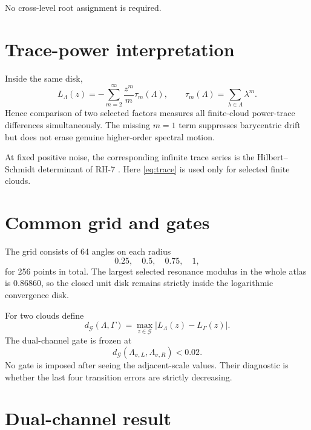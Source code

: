\documentclass[11pt]{article}
\theoremstyle{remark}\newtheorem{remark}[theorem]{Remark}
\begin{document}
No cross-level root assignment is required.

\section{Trace-power interpretation}

Inside the same disk,
\begin{equation}\label{eq:trace}
 L_\Lambda(z)=
 -\sum_{m=2}^{\infty}\frac{z^m}{m}\tau_m(\Lambda),
 \qquad
 \tau_m(\Lambda)=\sum_{\lambda\in\Lambda}\lambda^m.
\end{equation}
Hence comparison of two selected factors measures all finite-cloud power-trace
differences simultaneously. The missing $m=1$ term suppresses barycentric
drift but does not erase genuine higher-order spectral motion.

At fixed positive noise, the corresponding infinite trace series is the
Hilbert--Schmidt determinant of RH-7 \citep{WangRH7}. Here
\eqref{eq:trace} is used only for selected finite clouds.

\section{Common grid and gates}

The grid consists of 64 angles on each radius
\[
 0.25,\quad0.5,\quad0.75,\quad1,
\]
for 256 points in total. The largest selected resonance modulus in the whole
atlas is $0.86860$, so the closed unit disk remains strictly inside the
logarithmic convergence disk.

For two clouds define
\begin{equation}\label{eq:metric}
 d_{\mathcal G}(\Lambda,\Gamma)
 =\max_{z\in\mathcal G}|L_\Lambda(z)-L_\Gamma(z)|.
\end{equation}
The dual-channel gate is frozen at
\[
 d_{\mathcal G}(\Lambda_{\sigma,L},
 \Lambda_{\sigma,R})<0.02.
\]
No gate is imposed after seeing the adjacent-scale values. Their diagnostic is
whether the last four transition errors are strictly decreasing.

\section{Dual-channel result}
\end{document}
